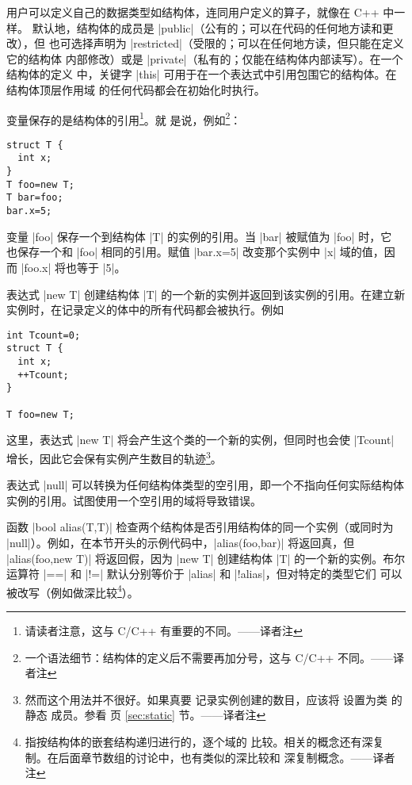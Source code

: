 \documentclass[nofonts,CJKnormalspaces]{ctexbook}[2009/05/20]
\newcommand\transnote[1]{\footnote{#1——译者注}}
\begin{document}
用户可以定义自己的数据类型如结构体，连同用户定义的算子，就像在 C++ 中一样。
默认地，结构体的成员是 |public|（公有的；可以在代码的任何地方读和更改），但
也可选择声明为 |restricted|（受限的；可以在任何地方读，但只能在定义它的结构体
内部修改）或是 |private|（私有的；仅能在结构体内部读写）。在一个结构体的定义
中，关键字 |this| 可用于在一个表达式中引用包围它的结构体。在结构体顶层作用域
的任何代码都会在初始化时执行。

变量保存的是结构体的引用\transnote{请读者注意，这与 C/C++ 有重要的不同。}。就
是说，例如\transnote{一个语法细节：结构体的定义后不需要再加分号，这与 C/C++
不同。}：
\begin{lstlisting}
struct T {
  int x;
}
T foo=new T;
T bar=foo;
bar.x=5;
\end{lstlisting}

变量 |foo| 保存一个到结构体 |T| 的实例的引用。当 |bar| 被赋值为 |foo| 时，它
也保存一个和 |foo| 相同的引用。赋值 |bar.x=5| 改变那个实例中 |x| 域的值，因而
|foo.x| 将也等于 |5|。

表达式 |new T| 创建结构体 |T| 的一个新的实例并返回到该实例的引用。在建立新
实例时，在记录定义的体中的所有代码都会被执行。例如
\begin{lstlisting}
int Tcount=0;
struct T {
  int x;
  ++Tcount;
}

T foo=new T;
\end{lstlisting}

这里，表达式 |new T| 将会产生这个类的一个新的实例，但同时也会使 |Tcount| 
增长，因此它会保有实例产生数目的轨迹\transnote{然而这个用法并不很好。如果真要
记录实例创建的数目，应该将  设置为类 \inlinecode{T} 的静态
成员。参看 \pageref{sec:static} 页 \ref{sec:static} 节。}。

表达式 |null| 可以转换为任何结构体类型的空引用，即一个不指向任何实际结构体
实例的引用。试图使用一个空引用的域将导致错误。

函数 |bool alias(T,T)| 检查两个结构体是否引用结构体的同一个实例（或同时为
|null|）。例如，在本节开头的示例代码中，|alias(foo,bar)| 将返回真，但
|alias(foo,new T)| 将返回假，因为 |new T| 创建结构体 |T| 的一个新的实例。布尔
运算符 |==| 和 |!=| 默认分别等价于 |alias| 和 |!alias|，但对特定的类型它们
可以被改写（例如做深比较\transnote{指按结构体的嵌套结构递归进行的，逐个域的
比较。相关的概念还有深复制。在后面章节数组的讨论中，也有类似的深比较和
深复制概念。}）。
\end{document}
